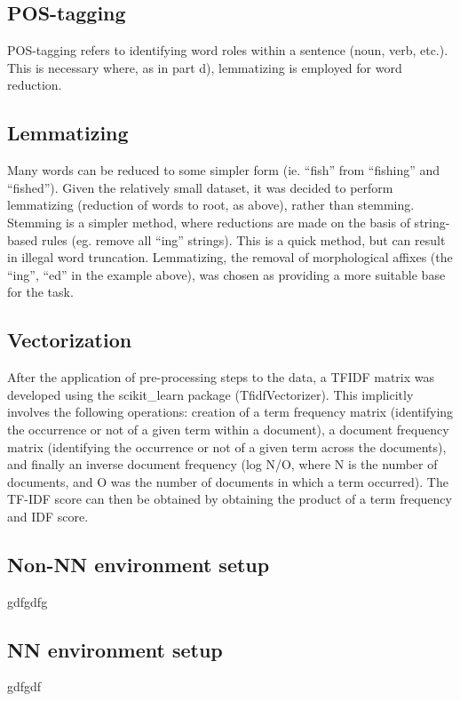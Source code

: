 \documentclass{article}
\begin{document}
\subsection{POS-tagging}
POS-tagging refers to identifying word roles within a sentence (noun, verb,
etc.). This is necessary where, as in part d), lemmatizing is employed for word
reduction.
\subsection{Lemmatizing}
Many words can be reduced to some simpler form (ie. “fish” from “fishing” and
“fished”). Given the relatively small dataset, it was decided to perform
lemmatizing (reduction of words to root, as above), rather than stemming.
Stemming is a simpler method, where reductions are made on the basis of
string-based rules (eg. remove all “ing” strings). This is a quick method, but
can result in illegal word truncation. Lemmatizing, the removal of morphological
affixes (the “ing”, “ed” in the example above), was chosen as providing a more
suitable base for the task.
\subsection{Vectorization}
After the application of pre-processing steps to the data, a TFIDF matrix was
developed using the scikit\_learn package (TfidfVectorizer). This implicitly
involves the following operations: creation of a term frequency matrix
(identifying the occurrence or not of a given term within a document), a
document frequency matrix (identifying the occurrence or not of a given term
across the documents), and finally an inverse document frequency (log N/O, where
N is the number of documents, and O was the number of documents in which a term
occurred). The TF-IDF score can then be obtained by obtaining the product of a
term frequency and IDF score.
\subsection{Non-NN environment setup}
gdfgdfg
\subsection{NN environment setup}
gdfgdf
\end{document}
